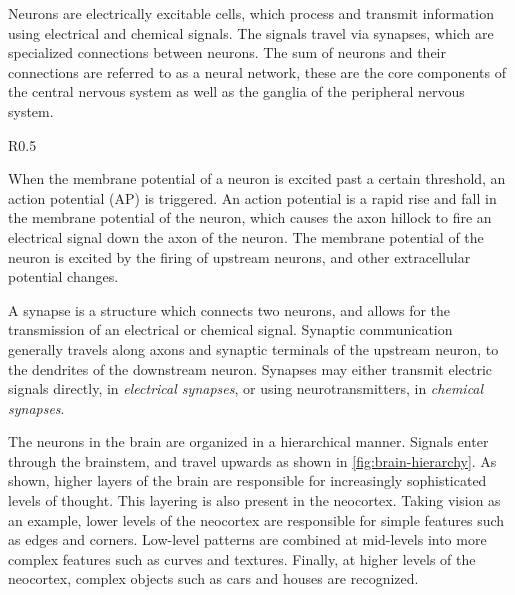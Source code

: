 \documentclass[\rootfolder/main.tex]{subfiles}
\begin{document}
Neurons are electrically excitable cells, which process and transmit information using electrical and chemical signals.
The signals travel via synapses, which are specialized connections between neurons.
The sum of neurons and their connections are referred to as a neural network, these are the core components of the central nervous system as well as the ganglia of the peripheral nervous system.

\begin{wrapfigure}{R}{0.5\columnwidth}
    \caption{Model of the hierarcical structure of the brain\cite{Perry1999}.\label{fig:brain-hierarchy}}
\end{wrapfigure}

When the membrane potential of a neuron is excited past a certain threshold, an action potential (AP) is triggered.
An action potential is a rapid rise and fall in the membrane potential of the neuron, which causes the axon hillock to fire an electrical signal down the axon of the neuron.
The membrane potential of the neuron is excited by the firing of upstream neurons, and other extracellular potential changes.

A synapse is a structure which connects two neurons, and allows for the transmission of an electrical or chemical signal.
Synaptic communication generally travels along axons and synaptic terminals of the upstream neuron, to the dendrites of the downstream neuron.
Synapses may either transmit electric signals directly, in \emph{electrical synapses}, or using neurotransmitters, in \emph{chemical synapses}.

The neurons in the brain are organized in a hierarchical manner.
Signals enter through the brainstem, and travel upwards as shown in \cref{fig:brain-hierarchy}.
As shown, higher layers of the brain are responsible for increasingly sophisticated levels of thought.
This layering is also present in the neocortex.
Taking vision as an example, lower levels of the neocortex are responsible for simple features such as edges and corners.
Low-level patterns are combined at mid-levels into more complex features such as curves and textures.
Finally, at higher levels of the neocortex, complex objects such as cars and houses are recognized.

\end{document}
